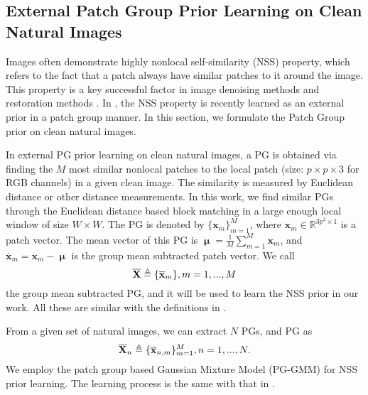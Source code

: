 \documentclass[10pt,twocolumn,letterpaper]{article}
\begin{document}
\subsection{External Patch Group Prior Learning on Clean Natural Images}
Images often demonstrate highly nonlocal self-similarity (NSS) property, which refers to the fact that a patch always have similar patches to it around the image. This property is a key successful factor in image denoising methods \cite{nlm,bm3d,lssc,ncsr,wnnm} and restoration methods \cite{}. In \cite{pgpd}, the NSS property is recently learned as an external prior in a patch group manner. In this section, we formulate the Patch Group prior on clean natural images.

In external PG prior learning on clean natural images, a PG is obtained via finding the $M$ most similar nonlocal patches to the local patch (size: $p\times p \times 3$ for RGB channels) in a given clean image. The similarity is measured by Euclidean distance or other distance measurements. In this work, we find similar PGs through the Euclidean distance based block matching in a large enough local window of size $W\times W$. The PG is denoted by $\{\mathbf{x}_{m}\}_{m=1}^{M}$, where $\mathbf{x}_{m}\in \mathbb{R}^{3p^{2}\times1}$ is a patch vector. The mean vector of this PG is $\boldsymbol{\upmu}=\frac{1}{M}\sum_{m=1}^{M}\mathbf{x}_{m}$, and $\mathbf{\overline{x}}_{m}=\mathbf{x}_{m}-\boldsymbol{\upmu}$ is the group mean subtracted patch vector. We call
\begin{equation}\label{equ1}
\setlength{\abovedisplayskip}{2pt}
\setlength{\belowdisplayskip}{2pt}
\mathbf{\overline{X}}\triangleq \{\mathbf{\overline{x}}_{m}\}, m=1,...,M
\end{equation}
the group mean subtracted PG, and it will be used to learn the NSS prior in our work. All these are similar with the definitions in \cite{pgpd}. 

From a given set of natural images, we can extract $N$ PGs, and  PG as
\begin{equation}\label{equ2}
\setlength{\abovedisplayskip}{2pt}
\setlength{\belowdisplayskip}{2pt}
\mathbf{\overline{X}}_{n}\triangleq \{\mathbf{\overline{x}}_{n,m}\}_{m=1}^{M}, n=1,...,N.
\end{equation}
We employ the patch group based Gaussian Mixture Model (PG-GMM) for NSS prior learning. The learning process is the same with that in \cite{pgpd}.
\end{document}
